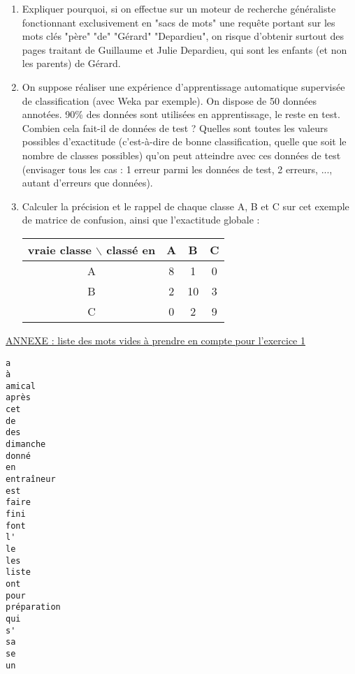 \documentclass[a4paper, 11pt]{article}
\begin{document}
\begin{enumerate}
	\item Expliquer pourquoi, si on effectue sur un moteur de recherche généraliste fonctionnant
		exclusivement en "sacs de mots" une requête portant sur les mots clés "père" "de" "Gérard"
		"Depardieu", on risque d'obtenir surtout des pages traitant de Guillaume et Julie Depardieu, qui
		sont les enfants (et non les parents) de Gérard.
	\item On suppose réaliser une expérience d'apprentissage automatique supervisée de classification
		(avec Weka par exemple). On dispose de 50 données annotées. 90\% des données sont utilisées en
		apprentissage, le reste en test. Combien cela fait-il de données de test ? Quelles sont toutes
		les valeurs possibles d'exactitude (c'est-à-dire de bonne classification, quelle que soit le
		nombre de classes possibles) qu'on peut atteindre avec ces données de test (envisager tous les
		cas : 1 erreur parmi les données de test, 2 erreurs, ..., autant d'erreurs que données).
	\item Calculer la précision et le rappel de chaque classe A, B et C sur cet exemple de matrice de
		confusion, ainsi que l'exactitude globale :

		\begin{center}
			\begin{tabular}{|c|c|c|c|}
				\hline
				vraie classe $\backslash$ classé en & A & B & C \\
				\hline
				A & 8 & 1 & 0\\
				\hline
				B & 2 & 10 & 3\\
				\hline
				C & 0 & 2 & 9\\
				\hline
			\end{tabular}
		\end{center}
\end{enumerate}

\newpage
\noindent\underline{ANNEXE : liste des mots vides à prendre en compte
	pour l'exercice 1}
\begin{verbatim}
a
à
amical
après
cet
de
des
dimanche
donné
en
entraîneur
est
faire
fini
font
l'
le
les
liste
ont
pour
préparation
qui
s'
sa
se
un
\end{verbatim}
\end{document}
